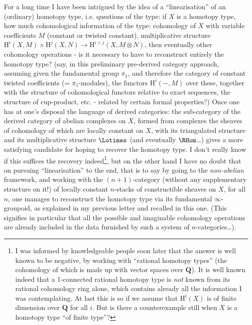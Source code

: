 For a long time I have been intrigued by the idea of a ``linearisation'' of an (ordinary) homotopy type, i.e. questions of the type: if $X$ is a homotopy type, how much cohomological information of the type: cohomology of $X$ with variable coefficients $M$ (constant or twisted constant), multiplicative structure $\mathrm{H}^i(X, M) \times \mathrm{H}^j(X, N) \to \mathrm{H}^{i + j}(X, M \otimes N)$, then eventually other cohomology operations - is it necessary to have to reconstruct entirely the homotopy type? (say, in this preliminary pre-derived category approach, assuming given the fundamental group $\pi_1$, and therefore the category of constant twisted coefficients (= $\pi_1$-modules), the functors $\mathrm{H}^i(-, M)$ over these, together with the structure of cohomological functors relative to exact sequences, the structure of cup-product, etc. - related by certain formal properties?) Once one has at one's disposal the language of derived categories: the sub-category of the derived category of abelian complexes on $X$, formed from complexes the sheaves of cohomology of which are locally constant on $X$, with its triangulated structure and its multiplicative structure $\Lotimes$ (and eventually $\RHom$\dots) gives a more satisfying candidate for hoping to recover the homotopy type. I don't really know if this suffices the recovery indeed\footnote{I was informed by knowledgeable people soon later that the answer is well known to be negative, by working with ``rational homotopy types'' (the cohomology of which is made up with vector spaces over $\mathbf{Q}$). It is well known indeed that a 1-connected rational homotopy type is \emph{not} known from its rational cohomology ring alone, which contains already all the information I was contemplating. At last this is so if we assume that $\mathrm{H}^i(X)$ is of finite dimension over $\mathbf{Q}$ for all $i$. But is there a counterexample still when $X$ is a homotopy type ``of finite type''?}, but on the other hand I have no doubt that on pursuing ``linearisation'' to the end, that is to say by going to the \emph{non-abelian} framework, and working with the $(n + 1)$-category (without any supplementary structure on it!) of locally constant $n$-stacks of constructible sheaves on $X$, for all $n$, one manages to reconstruct the homotopy type via its fundamental $\infty$-groupoid, as explained in my previous letter and recalled in this one. (This signifies in particular that all the possible and imaginable cohomology operations are already included in the data furnished by such a system of $n$-categories\dots).

